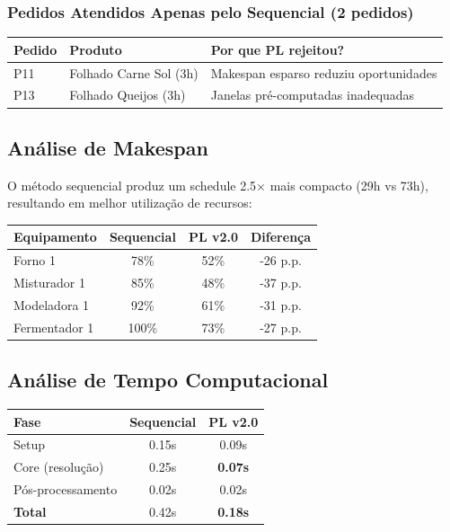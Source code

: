 \documentclass[11pt,a4paper]{article}
\begin{document}
\subsubsection{Pedidos Atendidos Apenas pelo Sequencial (2 pedidos)}

\begin{center}
\begin{tabular}{lll}
\toprule
\textbf{Pedido} & \textbf{Produto} & \textbf{Por que PL rejeitou?} \\
\midrule
P11 & Folhado Carne Sol (3h) & Makespan esparso reduziu oportunidades \\
P13 & Folhado Queijos (3h) & Janelas pré-computadas inadequadas \\
\bottomrule
\end{tabular}
\end{center}

\subsection{Análise de Makespan}

O método sequencial produz um schedule 2.5× mais compacto (29h vs 73h), resultando em melhor utilização de recursos:

\begin{center}
\begin{tabular}{lccc}
\toprule
\textbf{Equipamento} & \textbf{Sequencial} & \textbf{PL v2.0} & \textbf{Diferença} \\
\midrule
Forno 1 & 78\% & 52\% & -26 p.p. \\
Misturador 1 & 85\% & 48\% & -37 p.p. \\
Modeladora 1 & 92\% & 61\% & -31 p.p. \\
Fermentador 1 & 100\% & 73\% & -27 p.p. \\
\bottomrule
\end{tabular}
\end{center}

\subsection{Análise de Tempo Computacional}

\begin{center}
\begin{tabular}{lcc}
\toprule
\textbf{Fase} & \textbf{Sequencial} & \textbf{PL v2.0} \\
\midrule
Setup & 0.15s & 0.09s \\
Core (resolução) & 0.25s & \textbf{0.07s} \\
Pós-processamento & 0.02s & 0.02s \\
\midrule
\textbf{Total} & 0.42s & \textbf{0.18s} \\
\bottomrule
\end{tabular}
\end{center}
\end{document}
